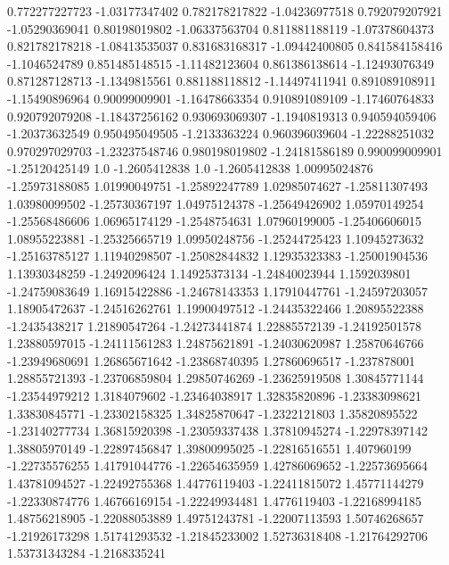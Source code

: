 0.772277227723   -1.03177347402
 0.782178217822   -1.04236977518
 0.792079207921   -1.05290369041
  0.80198019802   -1.06337563704
 0.811881188119   -1.07378604373
 0.821782178218   -1.08413535037
 0.831683168317   -1.09442400805
 0.841584158416    -1.1046524789
 0.851485148515   -1.11482123604
 0.861386138614   -1.12493076349
 0.871287128713    -1.1349815561
 0.881188118812   -1.14497411941
 0.891089108911   -1.15490896964
  0.90099009901   -1.16478663354
 0.910891089109   -1.17460764833
 0.920792079208   -1.18437256162
 0.930693069307    -1.1940819313
 0.940594059406   -1.20373632549
 0.950495049505    -1.2133363224
 0.960396039604   -1.22288251032
 0.970297029703   -1.23237548746
 0.980198019802   -1.24181586189
 0.990099009901   -1.25120425149
            1.0    -1.2605412838
            1.0    -1.2605412838
  1.00995024876   -1.25973188085
  1.01990049751   -1.25892247789
  1.02985074627   -1.25811307493
  1.03980099502   -1.25730367197
  1.04975124378   -1.25649426902
  1.05970149254   -1.25568486606
  1.06965174129    -1.2548754631
  1.07960199005   -1.25406606015
  1.08955223881   -1.25325665719
  1.09950248756   -1.25244725423
  1.10945273632   -1.25163785127
  1.11940298507   -1.25082844832
  1.12935323383   -1.25001904536
  1.13930348259    -1.2492096424
  1.14925373134   -1.24840023944
   1.1592039801   -1.24759083649
  1.16915422886   -1.24678143353
  1.17910447761   -1.24597203057
  1.18905472637   -1.24516262761
  1.19900497512   -1.24435322466
  1.20895522388    -1.2435438217
  1.21890547264   -1.24273441874
  1.22885572139   -1.24192501578
  1.23880597015   -1.24111561283
  1.24875621891   -1.24030620987
  1.25870646766   -1.23949680691
  1.26865671642   -1.23868740395
  1.27860696517     -1.237878001
  1.28855721393   -1.23706859804
  1.29850746269   -1.23625919508
  1.30845771144   -1.23544979212
   1.3184079602   -1.23464038917
  1.32835820896   -1.23383098621
  1.33830845771   -1.23302158325
  1.34825870647    -1.2322121803
  1.35820895522   -1.23140277734
  1.36815920398   -1.23059337438
  1.37810945274   -1.22978397142
  1.38805970149   -1.22897456847
  1.39800995025   -1.22816516551
    1.407960199   -1.22735576255
  1.41791044776   -1.22654635959
  1.42786069652   -1.22573695664
  1.43781094527   -1.22492755368
  1.44776119403   -1.22411815072
  1.45771144279   -1.22330874776
  1.46766169154   -1.22249934481
   1.4776119403   -1.22168994185
  1.48756218905   -1.22088053889
  1.49751243781   -1.22007113593
  1.50746268657   -1.21926173298
  1.51741293532   -1.21845233002
  1.52736318408   -1.21764292706
  1.53731343284    -1.2168335241
